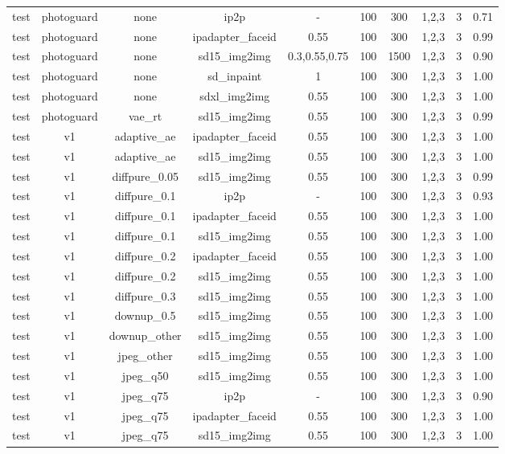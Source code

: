 \begin{table}[t]
{\begin{tabular}{lccccccccc}
test & photoguard & none & ip2p & - & 100 & 300 & 1,2,3 & 3 & 0.71 \\
test & photoguard & none & ipadapter\_faceid & 0.55 & 100 & 300 & 1,2,3 & 3 & 0.99 \\
test & photoguard & none & sd15\_img2img & 0.3,0.55,0.75 & 100 & 1500 & 1,2,3 & 3 & 0.90 \\
test & photoguard & none & sd\_inpaint & 1 & 100 & 300 & 1,2,3 & 3 & 1.00 \\
test & photoguard & none & sdxl\_img2img & 0.55 & 100 & 300 & 1,2,3 & 3 & 1.00 \\
test & photoguard & vae\_rt & sd15\_img2img & 0.55 & 100 & 300 & 1,2,3 & 3 & 0.99 \\
test & v1 & adaptive\_ae & ipadapter\_faceid & 0.55 & 100 & 300 & 1,2,3 & 3 & 1.00 \\
test & v1 & adaptive\_ae & sd15\_img2img & 0.55 & 100 & 300 & 1,2,3 & 3 & 1.00 \\
test & v1 & diffpure\_0.05 & sd15\_img2img & 0.55 & 100 & 300 & 1,2,3 & 3 & 0.99 \\
test & v1 & diffpure\_0.1 & ip2p & - & 100 & 300 & 1,2,3 & 3 & 0.93 \\
test & v1 & diffpure\_0.1 & ipadapter\_faceid & 0.55 & 100 & 300 & 1,2,3 & 3 & 1.00 \\
test & v1 & diffpure\_0.1 & sd15\_img2img & 0.55 & 100 & 300 & 1,2,3 & 3 & 1.00 \\
test & v1 & diffpure\_0.2 & ipadapter\_faceid & 0.55 & 100 & 300 & 1,2,3 & 3 & 1.00 \\
test & v1 & diffpure\_0.2 & sd15\_img2img & 0.55 & 100 & 300 & 1,2,3 & 3 & 1.00 \\
test & v1 & diffpure\_0.3 & sd15\_img2img & 0.55 & 100 & 300 & 1,2,3 & 3 & 1.00 \\
test & v1 & downup\_0.5 & sd15\_img2img & 0.55 & 100 & 300 & 1,2,3 & 3 & 1.00 \\
test & v1 & downup\_other & sd15\_img2img & 0.55 & 100 & 300 & 1,2,3 & 3 & 1.00 \\
test & v1 & jpeg\_other & sd15\_img2img & 0.55 & 100 & 300 & 1,2,3 & 3 & 1.00 \\
test & v1 & jpeg\_q50 & sd15\_img2img & 0.55 & 100 & 300 & 1,2,3 & 3 & 1.00 \\
test & v1 & jpeg\_q75 & ip2p & - & 100 & 300 & 1,2,3 & 3 & 0.90 \\
test & v1 & jpeg\_q75 & ipadapter\_faceid & 0.55 & 100 & 300 & 1,2,3 & 3 & 1.00 \\
test & v1 & jpeg\_q75 & sd15\_img2img & 0.55 & 100 & 300 & 1,2,3 & 3 & 1.00 \\

\end{tabular}}
\end{table}
